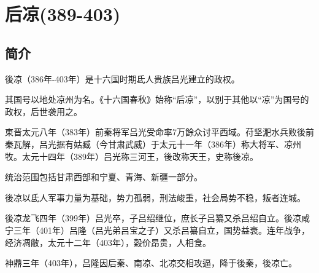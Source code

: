 

\section{后凉\tiny(389-403)}

\subsection{简介}

後凉（386年-403年）是十六国时期氐人贵族吕光建立的政权。

其国号以地处凉州为名。《十六国春秋》始称“后凉”，以别于其他以“凉”为国号的政权，后世袭用之。

東晋太元八年（383年）前秦将军吕光受命率7万餘众讨平西域。苻坚淝水兵败後前秦瓦解，吕光据有姑臧（今甘肃武威）于太元十一年（386年）称大将军、凉州牧。太元十四年（389年）吕光称三河王，後改称天王，史称後凉。

统治范围包括甘肃西部和宁夏、青海、新疆一部分。

後凉以氐人军事力量为基础，势力孤弱，刑法峻重，社会局势不稳，叛者连城。

後凉龙飞四年（399年）吕光卒，子吕绍继位，庶长子吕纂又杀吕绍自立。後凉咸宁三年（401年）吕隆（吕光弟吕宝之子）又杀吕纂自立，国势益衰。连年战争，经济凋敝，太元十二年（403年），穀价昂贵，人相食。

神鼎三年（403年），吕隆因后秦、南凉、北凉交相攻逼，降于後秦，後凉亡。





